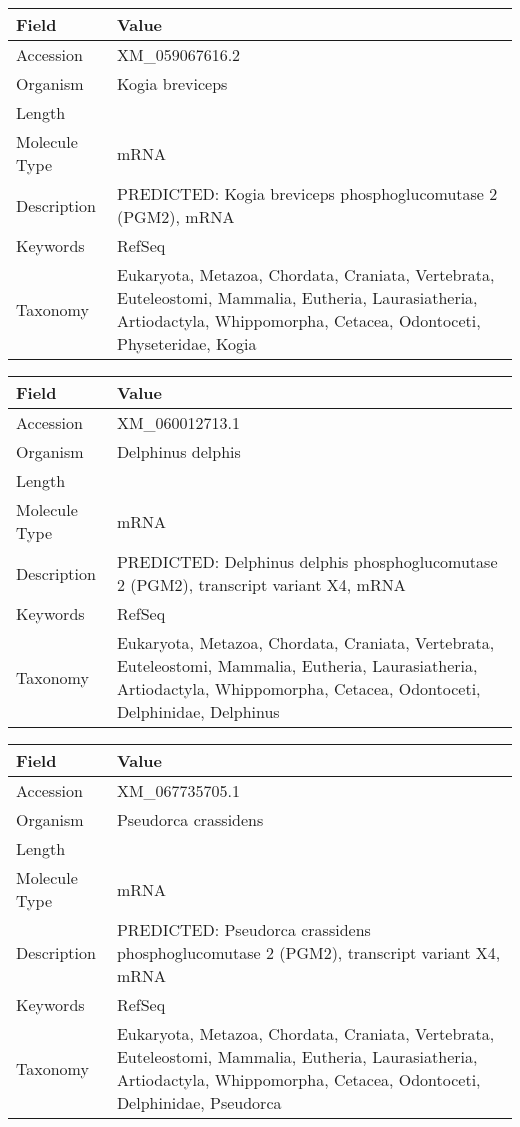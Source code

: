 \documentclass[10pt]{article}
\begin{document}
{\footnotesize
\begin{longtable}{>{\raggedright\arraybackslash}p{4.5cm} >{\raggedright\arraybackslash}p{11.5cm}}
\textbf{Field} & \textbf{Value} \\
\hline
Accession & XM\_059067616.2 \\
Organism & Kogia breviceps \\
Length & 4214 \\
Molecule Type & mRNA \\
Description & PREDICTED: Kogia breviceps phosphoglucomutase 2 (PGM2), mRNA \\
Keywords & RefSeq \\
Taxonomy & Eukaryota, Metazoa, Chordata, Craniata, Vertebrata, Euteleostomi, Mammalia, Eutheria, Laurasiatheria, Artiodactyla, Whippomorpha, Cetacea, Odontoceti, Physeteridae, Kogia \\
\end{longtable}
}

{\footnotesize
\begin{longtable}{>{\raggedright\arraybackslash}p{4.5cm} >{\raggedright\arraybackslash}p{11.5cm}}
\textbf{Field} & \textbf{Value} \\
\hline
Accession & XM\_060012713.1 \\
Organism & Delphinus delphis \\
Length & 6671 \\
Molecule Type & mRNA \\
Description & PREDICTED: Delphinus delphis phosphoglucomutase 2 (PGM2), transcript variant X4, mRNA \\
Keywords & RefSeq \\
Taxonomy & Eukaryota, Metazoa, Chordata, Craniata, Vertebrata, Euteleostomi, Mammalia, Eutheria, Laurasiatheria, Artiodactyla, Whippomorpha, Cetacea, Odontoceti, Delphinidae, Delphinus \\
\end{longtable}
}

{\footnotesize
\begin{longtable}{>{\raggedright\arraybackslash}p{4.5cm} >{\raggedright\arraybackslash}p{11.5cm}}
\textbf{Field} & \textbf{Value} \\
\hline
Accession & XM\_067735705.1 \\
Organism & Pseudorca crassidens \\
Length & 12512 \\
Molecule Type & mRNA \\
Description & PREDICTED: Pseudorca crassidens phosphoglucomutase 2 (PGM2), transcript variant X4, mRNA \\
Keywords & RefSeq \\
Taxonomy & Eukaryota, Metazoa, Chordata, Craniata, Vertebrata, Euteleostomi, Mammalia, Eutheria, Laurasiatheria, Artiodactyla, Whippomorpha, Cetacea, Odontoceti, Delphinidae, Pseudorca \\
\end{longtable}
}
\end{document}

